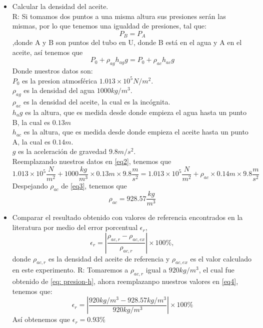 \documentclass[a4paper, 12p]{article}
\begin{document}
\begin{itemize}
      \item Calcular la densidad del aceite.\\
      R: Si tomamos dos puntos a una misma altura sus presiones serán las mismas, por lo que tenemos una igualdad de presiones, tal que:
      \begin{equation*}
      P_{B} = P_{A}
      \end{equation*}            
      ,donde A y B son puntos del tubo en U, donde B está en el agua y A en el aceite, así tenemos que
      \begin{equation}\label{eq2}
      P_{0} +  \rho_{ag} h_{ag} g = P_{0} +  \rho_{ac} h_{ac} g  
      \end{equation}
      Donde nuestros datos son:\\
      $P_{0}$ es la presion atmosférica $1.013 \times 10^5 N/m^2$.\\
      $\rho_{ag}$ es la densidad del agua $1000 kg/m^3$.\\
      $\rho_{ac}$ es la densidad del aceite, la cual es la incógnita.\\
      $h_ag$ es la altura, que es medida desde donde empieza el agua hasta un punto B, la cual es $0.13m$\\
      $h_{ac}$ es la altura, que es medida desde donde empieza el aceite hasta un punto A, la cual es $0.14m$.\\
      $g$ es la aceleración de gravedad $9.8 m/s^2$.\\
     
      Reemplazando nuestros datos en \ref{eq2}, tenemos que
      \begin{equation}\label{eq3}
      1.013 \times 10^5\dfrac{N}{m^2} + 1000\dfrac{kg}{m^3} \times 0.13m \times 9.8\dfrac{m}{s^2} = 1.013 \times 10^5\dfrac{N}{m^2} +  \rho_{ac} \times 0.14m \times 9.8\dfrac{m}{s^2}  
      \end{equation}
      Despejando $\rho_{ac}$ de \ref{eq3}, tenemos que 
      \begin{equation*}
      \rho_{ac} = 928.57\dfrac{kg}{m^3}
      \end{equation*}
      
      \item Comparar el resultado obtenido con valores de referencia encontrados en la literatura por medio del error porcentual $\epsilon_{r}$,
      \begin{equation}\label{eq4}
      \epsilon_{r} = \left|\dfrac{\rho_{ac,r} - \rho_{ac,ex}}{\rho_{ac,r}} \right| \times 100 \% ,
      \end{equation}
      donde $\rho_{ac,r}$ es la densidad del aceite de referencia y $\rho_{ac,ex}$ es el valor calculado en este experimento.
      R: Tomaremos a $\rho_{ac,r}$  igual a $920 kg/m^3$, el cual fue obtenido de \ref{eq: presion-h}, ahora reemplazanpo nuestros valores en \ref{eq4}, tenemos que:
      \begin{equation*}
      \epsilon_{r} = \left|\dfrac{ 920 kg/m^3 - 928.57 kg/m^3}{920 kg/m^3} \right| \times 100 \%
      \end{equation*}
       Así obtenemos que $\epsilon_{r} = 0.93 \%$
     
     \end{itemize}
\end{document}
